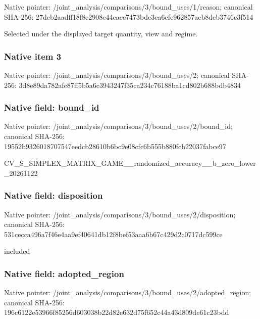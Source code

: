 \documentclass[10pt,a4paper]{article}
\begin{document}
Native pointer: /joint\_analysis/comparis\allowbreak{}ons/3/bound\_uses/1/reaso\allowbreak{}n; canonical SHA-256: 27dcb2aadff18f8c2908e44e\allowbreak{}aee7473bde3ca6cfc962857a\allowbreak{}cb8deb3746c3f514


Selected under the displayed target quantity, view and regime.


\subsubsection{Native item 3}


Native pointer: /joint\_analysis/comparis\allowbreak{}ons/3/bound\_uses/2; canonical SHA-256: 3d8e89da782afc87ff5b5a6c\allowbreak{}3943247f35ca234c76188ba1\allowbreak{}cd802b688bdb4834



\subsubsection{Native field: bound\_id}


Native pointer: /joint\_analysis/comparis\allowbreak{}ons/3/bound\_uses/2/bound\allowbreak{}\_id; canonical SHA-256: 19552b9326018707547eedcb\allowbreak{}28610b6bc9e08cfc6b555b88\allowbreak{}0fcb22037fabce97


CV\_S\_SIMPLEX\_MATRIX\_GAME\allowbreak{}\_\_randomized\_accuracy\_\_b\allowbreak{}\_zero\_lower\_20261122


\subsubsection{Native field: disposition}


Native pointer: /joint\_analysis/comparis\allowbreak{}ons/3/bound\_uses/2/dispo\allowbreak{}sition; canonical SHA-256: 531cecca496a7f46e4aa9ef4\allowbreak{}0641db12f8bef53aaa6b67c4\allowbreak{}29d2c0717dc599ce


included


\subsubsection{Native field: adopted\_region}


Native pointer: /joint\_analysis/comparis\allowbreak{}ons/3/bound\_uses/2/adopt\allowbreak{}ed\_region; canonical SHA-256: 196c6122e53966f85256d603\allowbreak{}038b22d82e632d75f652c44a\allowbreak{}43d809de61c23bdd
\end{document}
